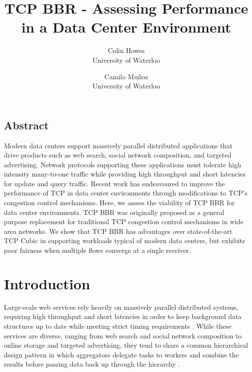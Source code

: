 \documentclass[letterpaper,twocolumn,10pt]{article}
\begin{document}
\date{}

\title{\Large \bf TCP BBR - Assessing Performance in a Data Center Environment}

\author{
{\rm Colin Howes}\\
University of Waterloo
\and
{\rm Camilo Mu\~{n}oz}\\
University of Waterloo
} %

\maketitle

\thispagestyle{empty}


\subsection*{Abstract}

Modern data centers support massively parallel distributed applications that drive products such as web search, social network composition, and targeted advertising. Network protocols supporting these applications must tolerate high intensity many-to-one traffic while providing high throughput and short latencies for update and query traffic. Recent work has endeavoured to improve the performance of TCP in data center environments through modifications to TCP's congestion control mechanisms. Here, we assess the viability of TCP BBR for data center environments. TCP BBR was originally proposed as a general purpose replacement for traditional TCP congestion control mechanisms in wide area networks. We show that TCP BBR has advantages over state-of-the-art TCP Cubic in supporting workloads typical of modern data centers, but exhibits poor fairness when multiple flows converge at a single receiver.

\section{Introduction}

Large-scale web services rely heavily on massively parallel distributed systems, requiring high throughput and short latencies in order to keep background data structures up to date while meeting strict timing requirements \cite{alizadeh_data_2010, chen_understanding_2009, wu_ictcp:_2013}. While these services are diverse, ranging from web search and social network composition to online storage and targeted advertising, they tend to share a common hierarchical design pattern in which aggregators delegate tasks to workers and combine the results before passing data back up through the hierarchy \cite{alizadeh_data_2010, chen_understanding_2009}. 
\end{document}
